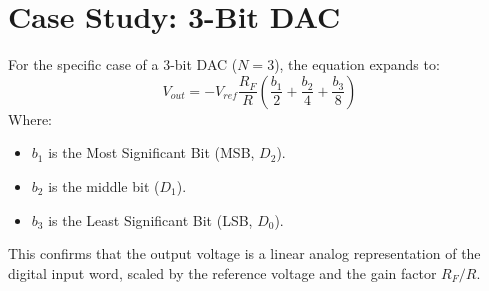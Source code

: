 \documentclass[11pt, a4paper]{article}
\begin{document}
\section{Case Study: 3-Bit DAC}
For the specific case of a 3-bit DAC ($N=3$), the equation expands to:
\begin{equation}
    V_{out} = - V_{ref} \frac{R_F}{R} \left( \frac{b_1}{2} + \frac{b_2}{4} + \frac{b_3}{8} \right)
\end{equation}
Where:
\begin{itemize}
    \item $b_1$ is the Most Significant Bit (MSB, $D_2$).
    \item $b_2$ is the middle bit ($D_1$).
    \item $b_3$ is the Least Significant Bit (LSB, $D_0$).
\end{itemize}

This confirms that the output voltage is a linear analog representation of the digital input word, scaled by the reference voltage and the gain factor $R_F/R$.
\end{document}
